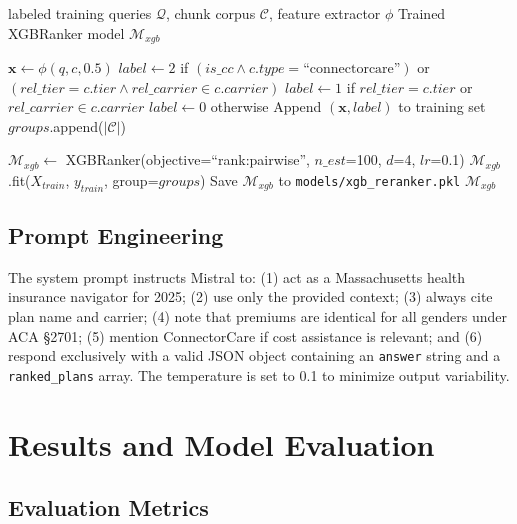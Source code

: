 \documentclass[12pt, letterpaper]{article}
\newenvironment{pseudoblock}[1]{%
  \begin{mdframed}[
    backgroundcolor=pseudobg,
    linecolor=pseudoframe,
    linewidth=1.5pt,
    frametitle={\color{pseudoframe}\bfseries\small Pseudo-code: #1},
    frametitlebackgroundcolor=pseudoframe!15
  ]
  \begin{algorithmic}[1]
}{%
  \end{algorithmic}
  \end{mdframed}
}
\begin{document}
\begin{pseudoblock}{XGBoost Re-Ranker Training}
 labeled training queries $\mathcal{Q}$, chunk corpus $\mathcal{C}$, feature extractor $\phi$
\ENSURE Trained XGBRanker model $\mathcal{M}_{xgb}$

        \STATE $\mathbf{x} \gets \phi(q, c, 0.5)$   
        \STATE $label \gets 2$ if $(is\_cc \wedge c.type = \text{``connectorcare''})$
        \STATE \quad\quad\quad\quad or $(rel\_tier = c.tier \wedge rel\_carrier \in c.carrier)$
        \STATE $label \gets 1$ if $rel\_tier = c.tier$ or $rel\_carrier \in c.carrier$
        \STATE $label \gets 0$ otherwise
        \STATE Append $(\mathbf{x}, label)$ to training set
    \ENDFOR
    \STATE $groups$.append($|\mathcal{C}|$)
\ENDFOR

\STATE $\mathcal{M}_{xgb} \gets$ XGBRanker(objective=``rank:pairwise'', $n\_est$=100, $d$=4, $lr$=0.1)
\STATE $\mathcal{M}_{xgb}$.fit($X_{train}$, $y_{train}$, group=$groups$)
\STATE Save $\mathcal{M}_{xgb}$ to \texttt{models/xgb\_reranker.pkl}
\RETURN $\mathcal{M}_{xgb}$
\end{pseudoblock}

\subsection{Prompt Engineering}

The system prompt instructs Mistral to: (1) act as a Massachusetts health insurance navigator for 2025; (2) use only the provided context; (3) always cite plan name and carrier; (4) note that premiums are identical for all genders under ACA \S2701; (5) mention ConnectorCare if cost assistance is relevant; and (6) respond exclusively with a valid JSON object containing an \texttt{answer} string and a \texttt{ranked\_plans} array. The temperature is set to 0.1 to minimize output variability.

\section{Results and Model Evaluation}
\label{sec:results}

\subsection{Evaluation Metrics}
\end{document}
